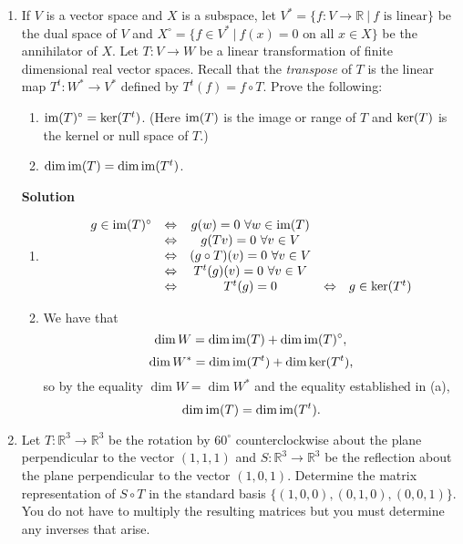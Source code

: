 \documentclass{article}
\def\im{\mathop{\rm im}\nolimits}
\def\ker{\mathop{\rm ker}\nolimits}
\begin{document}
\begin{enumerate}
\item If \(V\) is a vector space and \(X\) is a subspace, let \(V^* = \{f : V \to \mathbb{R} \ | \ f \text{ is linear}\}\) be the dual space of \(V\) and \(X^{\circ} = \{f \in V^* \ | \ f(x) = 0 \text{ on all } x \in X\}\) be the annihilator of \(X\).  Let \(T : V \to W\) be a linear transformation of finite dimensional real vector spaces.  Recall that the {\em transpose} of \(T\) is the linear map \(T^t : W^* \to V^*\) defined by \(T^t(f) = f \circ T\).  Prove the following:
\begin{enumerate}
\item \(\im(T)^{\circ} = \ker(T^t)\).  (Here \(\im(T)\) is the image or range of \(T\) and \(\ker(T)\) is the kernel or null space of \(T\).)
\item \(\dim \im(T) = \dim \im(T^t)\).
\end{enumerate}

{\bf Solution}

\begin{enumerate}
\item
\[\begin{array}{*{5}{c}}
  g \in \im(T)^{\circ}
  & \Leftrightarrow & g(w) = 0 \ \forall w \in \im(T) & & \\
  & \Leftrightarrow & g(Tv) = 0 \ \forall v \in V & & \\
  & \Leftrightarrow & (g \circ T)(v) = 0 \ \forall v \in V & & \\
  & \Leftrightarrow & T^t(g)(v) = 0 \ \forall v \in V & & \\
  & \Leftrightarrow & T^t(g) = 0
  & \Leftrightarrow & g \in \ker(T^t)
  \end{array}\]

\item We have that
\[\dim W = \dim \im(T) + \dim \im(T)^{\circ},\]
\[\dim W^* = \dim \im(T^t) + \dim \ker(T^t),\]
so by the equality \(\dim W = \dim W^*\) and the equality established in (a),
\[\dim \im(T) = \dim \im(T^t).\]

\end{enumerate}



\item Let \(T : \mathbb{R}^3 \to \mathbb{R}^3\) be the rotation by \(60^{\circ}\) counterclockwise about the plane perpendicular to the vector \((1,1,1)\) and \(S : \mathbb{R}^3 \to \mathbb{R}^3\) be the reflection about the plane perpendicular to the vector \((1,0,1)\).  Determine the matrix representation of \(S \circ T\) in the standard basis \(\{(1,0,0), (0,1,0), (0,0,1)\}\).  You do not have to multiply the resulting matrices but you must determine any inverses that arise.


\end{enumerate}
\end{document}
